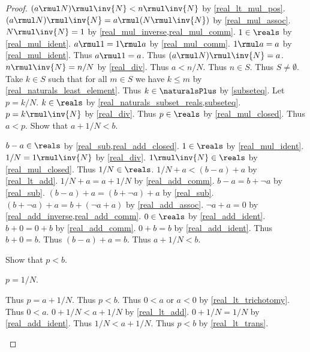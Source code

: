 \begin{proof}
    $(a \rmul N) \rmul \inv{N} < n \rmul \inv{N}$ by \cref{real_lt_mul_pos}.
    $(a \rmul N) \rmul \inv{N} = a \rmul (N \rmul \inv{N})$ by \cref{real_mul_assoc}.
    $N \rmul \inv{N} = 1$ by \cref{real_mul_inverse,real_mul_comm}.
    $1\in\reals$ by \cref{real_mul_ident}.
    $a \rmul 1 = 1 \rmul a$ by \cref{real_mul_comm}.
    $1 \rmul a = a$ by \cref{real_mul_ident}.
    Thus $a \rmul 1 = a$.
    Thus $(a \rmul N) \rmul \inv{N} = a$.
    $n \rmul \inv{N} = n / N$ by \cref{real_div}.
    Thus $a < n / N$.
    Thus $n\in S$.
    Thus $S\neq \emptyset$.
    Take $k\in S$ such that for all $m\in S$ we have $k \leq m$ by \cref{real_naturals_least_element}.
    Thus $k\in\naturalsPlus$ by \cref{subseteq}.
    Let $p = k / N$.
    $k\in\reals$ by \cref{real_naturals_subset_reals,subseteq}.
    $p = k \rmul \inv{N}$ by \cref{real_div}.
    Thus $p\in\reals$ by \cref{real_mul_closed}.
    Thus $a < p$.
    Show that $a + 1 / N < b$.
    \begin{subproof}
        $b - a\in\reals$ by \cref{real_sub,real_add_closed}.
        $1\in\reals$ by \cref{real_mul_ident}.
        $1 / N = 1 \rmul \inv{N}$ by \cref{real_div}.
        $1 \rmul \inv{N}\in\reals$ by \cref{real_mul_closed}.
        Thus $1 / N\in\reals$.
        $1 / N + a < (b - a) + a$ by \cref{real_lt_add}.
        $1 / N + a = a + 1 / N$ by \cref{real_add_comm}.
        $b - a = b + \neg{a}$ by \cref{real_sub}.
        $(b - a) + a = (b + \neg{a}) + a$ by \cref{real_sub}.
        $(b + \neg{a}) + a = b + (\neg{a} + a)$ by \cref{real_add_assoc}.
        $\neg{a} + a = 0$ by \cref{real_add_inverse,real_add_comm}.
        $0\in\reals$ by \cref{real_add_ident}.
        $b + 0 = 0 + b$ by \cref{real_add_comm}.
        $0 + b = b$ by \cref{real_add_ident}.
        Thus $b + 0 = b$.
        Thus $(b - a) + a = b$.
        Thus $a + 1 / N < b$.
    \end{subproof}
    Show that $p < b$.
    \begin{subproof}
        \begin{byCase}
            $p = 1 / N$.
            \begin{byCase}
                Thus $p = a + 1 / N$.
                Thus $p < b$.
                Thus $0 < a$ or $a < 0$ by \cref{real_lt_trichotomy}.
                Thus $0 < a$.
                $0 + 1 / N < a + 1 / N$ by \cref{real_lt_add}.
                $0 + 1 / N = 1 / N$ by \cref{real_add_ident}.
                Thus $1 / N < a + 1 / N$.
                Thus $p < b$ by \cref{real_lt_trans}.

\end{byCase}
\end{byCase}
\end{subproof}
\end{proof}
